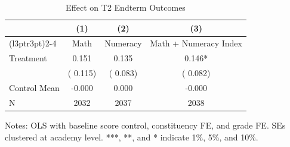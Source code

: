 \begin{table}[!htbp]
\centering
\caption{Effect on T2 Endterm Outcomes}
\label{tab:ng_t2_ete}
\begin{threeparttable}
\begin{tabular}[t]{lccc}
\toprule
 & (1) & (2) & (3) \\
\cmidrule(l{3pt}r{3pt}){2-4}
 & Math & Numeracy & Math + Numeracy Index \\
\midrule
Treatment &   0.151 &   0.135 &   0.146* \\
 & (  0.115) & (  0.083) & (  0.082) \\
\addlinespace
Control Mean &  -0.000 &   0.000 &  -0.000 \\
N & 2032 & 2037 & 2038 \\
\bottomrule
\end{tabular}
\begin{tablenotes}[para]
\item Notes: OLS with baseline score control, constituency FE, and grade FE. 
SEs clustered at academy level. ***, **, and * indicate 1\%, 5\%, and 10\%.
\end{tablenotes}
\end{threeparttable}
\end{table}
